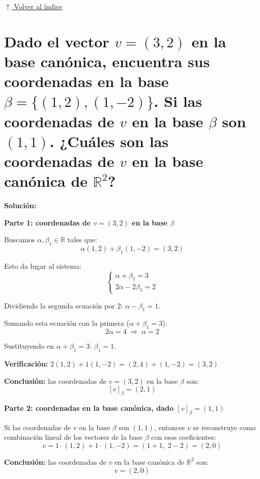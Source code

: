 \documentclass[12pt]{article}
\newcommand{\solucion}{%
    \vspace{0.8em}%
    \textbf{Solución:}%
    \vspace{0.8em}%
}
\newcommand{\volverindice}{%
    \vspace{1em}%
    \begin{flushright}%
        \hyperlink{indice}{\small $\uparrow$ Volver al índice}%
    \end{flushright}%
}
\begin{document}
\volverindice
\newpage

\section{Dado el vector $v = (3,2)$ en la base canónica, encuentra sus coordenadas en la base $\beta = \{(1,2),(1,-2)\}$. Si las coordenadas de $v$ en la base $\beta$ son $(1,1)$. ¿Cuáles son las coordenadas de $v$ en la base canónica de $\mathbb{R}^2$?}

\solucion

\textbf{Parte 1: coordenadas de $v=(3,2)$ en la base $\beta$}

Buscamos $\alpha,\beta_1 \in \mathbb{R}$ tales que:
\[
\alpha(1,2)+\beta_1(1,-2) = (3,2)
\]

Esto da lugar al sistema:
\[
\begin{cases}
\alpha+\beta_1 = 3 \\
2\alpha-2\beta_1 = 2
\end{cases}
\]

Dividiendo la segunda ecuación por $2$: $\alpha-\beta_1=1$.

Sumando esta ecuación con la primera ($\alpha+\beta_1=3$):
\[
2\alpha = 4 \;\Longrightarrow\; \alpha=2
\]

Sustituyendo en $\alpha+\beta_1=3$: $\beta_1=1$.

\textbf{Verificación:} $2(1,2)+1(1,-2) = (2,4)+(1,-2) = (3,2)$ \checkmark

\textbf{Conclusión:} las coordenadas de $v=(3,2)$ en la base $\beta$ son:
\[
[v]_\beta = (2,1)
\]

\textbf{Parte 2: coordenadas en la base canónica, dado $[v]_\beta=(1,1)$}

Si las coordenadas de $v$ en la base $\beta$ son $(1,1)$, entonces $v$ se reconstruye como combinación lineal de los vectores de la base $\beta$ con esos coeficientes:
\[
v = 1\cdot(1,2) + 1\cdot(1,-2) = (1+1,\; 2-2) = (2,0)
\]

\textbf{Conclusión:} las coordenadas de $v$ en la base canónica de $\mathbb{R}^2$ son:
\[
v = (2,0)
\]
\end{document}
